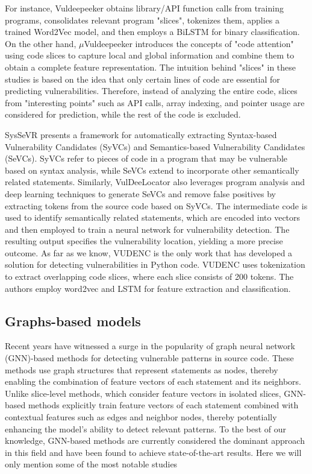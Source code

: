 \documentclass{ieeeaccess}
\begin{document}
\par For instance, Vuldeepeeker\cite{vuldeekeeper} obtains library/API function calls from training programs, consolidates relevant program "slices", tokenizes them, applies a trained Word2Vec\cite{word2vec} model, and then employs a BiLSTM for binary classification. On the other hand, $\mu$Vuldeepeeker\cite{vuldeepeeker2} introduces the concepts of "code attention" using code slices to capture local and global information and combine them to obtain a complete feature representation.  The intuition behind "slices" in these studies  is based on the idea that only certain lines of code are essential for predicting vulnerabilities. Therefore, instead of analyzing the entire code, slices from "interesting points" such as API calls, array indexing, and pointer usage are considered for prediction, while the rest of the code is excluded.
\par  SysSeVR\cite{SySeVR} presents a framework for automatically extracting Syntax-based Vulnerability Candidates (SyVCs) and Semantics-based Vulnerability Candidates (SeVCs). SyVCs refer to pieces of code in a program that may be vulnerable based on syntax analysis, while SeVCs extend to incorporate other semantically related statements. Similarly, VulDeeLocator\cite{VulDeeLocator} also leverages program analysis and deep learning techniques to generate SeVCs and remove false positives by extracting tokens from the source code based on SyVCs. The intermediate code is used to identify semantically related statements, which are encoded into vectors and then employed to train a neural network for vulnerability detection. The resulting output specifies the vulnerability location, yielding a more precise outcome. As far as we know, VUDENC\cite{VUDENC} is the only work that has developed a solution for detecting vulnerabilities in Python code. VUDENC uses tokenization to extract overlapping code slices, where each slice consists of 200 tokens. The authors employ word2vec and LSTM for feature extraction and classification.


\subsection{Graphs-based models}
\par Recent years have witnessed a surge in the popularity of graph neural network (GNN)-based methods for detecting vulnerable patterns in source code. These methods use graph structures that represent statements as nodes, thereby enabling the combination of feature vectors of each statement and its neighbors. Unlike slice-level methods, which consider feature vectors in isolated slices, GNN-based methods explicitly train feature vectors of each statement combined with contextual features such as edges and neighbor nodes, thereby potentially enhancing the model's ability to detect relevant patterns. To the best of our knowledge, GNN-based methods are currently considered the dominant approach in this field and have been found to achieve state-of-the-art results. Here we will only mention some of the most notable studies
\end{document}
